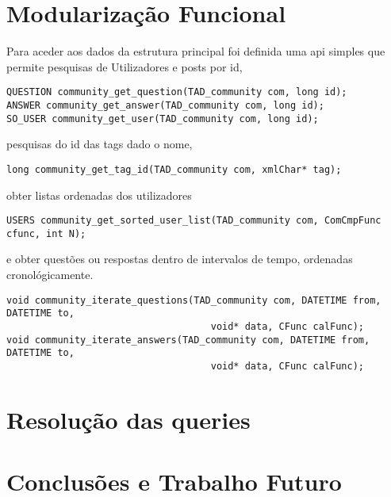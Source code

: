 \documentclass[10pt,a4paper]{report}
\begin{document}
\chapter{Modularização Funcional}
    Para aceder aos dados da estrutura principal foi definida uma api simples
    que permite pesquisas de Utilizadores e posts por id,
    \begin{verbatim}
QUESTION community_get_question(TAD_community com, long id);
ANSWER community_get_answer(TAD_community com, long id);
SO_USER community_get_user(TAD_community com, long id);
    \end{verbatim}
    pesquisas do id das tags dado o nome,
    \begin{verbatim}
long community_get_tag_id(TAD_community com, xmlChar* tag);
    \end{verbatim}
    obter listas ordenadas dos utilizadores
    \begin{verbatim}
USERS community_get_sorted_user_list(TAD_community com, ComCmpFunc cfunc, int N);
    \end{verbatim}
    e obter questões ou respostas dentro de intervalos de tempo,
    ordenadas cronológicamente.
    \begin{verbatim}
void community_iterate_questions(TAD_community com, DATETIME from, DATETIME to,
                                    void* data, CFunc calFunc);
void community_iterate_answers(TAD_community com, DATETIME from, DATETIME to,
                                    void* data, CFunc calFunc);
    \end{verbatim}

\chapter{Resolução das queries}

\chapter{Conclusões e Trabalho Futuro}
\end{document}

